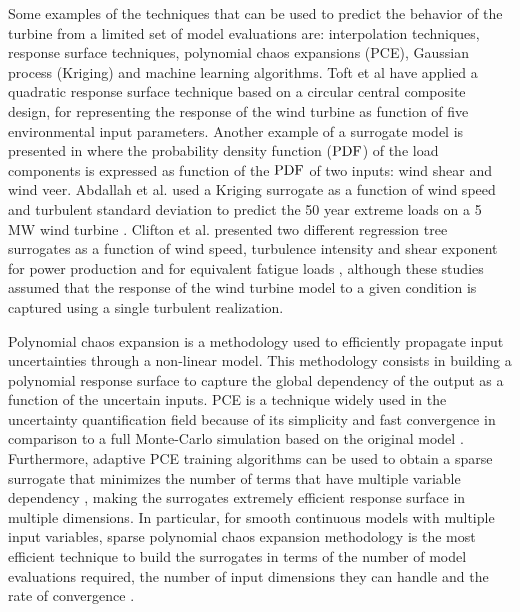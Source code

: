 \documentclass[preprint,12pt]{elsarticle}
\begin{document}
Some examples of the techniques that can be used to predict the behavior of the turbine from a limited set of model evaluations are: interpolation techniques, response surface techniques, polynomial chaos expansions (PCE), Gaussian process (Kriging) and machine learning algorithms. Toft et al \cite{toft2016assessment} have applied a quadratic response surface technique based on a circular central composite design, for representing the response of the wind turbine as function of five environmental input parameters. Another example of a surrogate model is presented in \cite{TallwindReport} where the probability density function ($\mathrm{PDF}$) of the load components is expressed as function of the $\mathrm{PDF}$ of two inputs: wind shear and wind veer. Abdallah et al. used a Kriging surrogate as a function of wind speed and turbulent standard deviation to predict the 50 year extreme loads on a 5 MW wind turbine \cite{abdallah2016influence}. Clifton et al. presented two different regression tree surrogates as a function of wind speed, turbulence intensity and shear exponent for power production \cite{clifton2013using} and for equivalent fatigue loads \cite{clifton2014effect}, although these studies assumed that the response of the wind turbine model to a given condition is captured using a single turbulent realization.

Polynomial chaos expansion is a methodology used to efficiently propagate input uncertainties through a non-linear model. This methodology consists in building a polynomial response surface to capture the global dependency of the output as a function of the uncertain inputs. PCE is a technique widely used in the uncertainty quantification field because of its simplicity and fast convergence in comparison to a full Monte-Carlo simulation based on the original model \cite{soize2004physical, le2004uncertainty, choi2004polynomial, berveiller2006stochastic, xiu2005high}. Furthermore, adaptive PCE training algorithms can be used to obtain a sparse surrogate that minimizes the number of terms that have multiple variable dependency \cite{blatman2011adaptive,pedregosa2011scikit,tibshirani1996regression}, making the surrogates extremely efficient response surface in multiple dimensions. In particular, for smooth continuous models with multiple input variables, sparse polynomial chaos expansion methodology is the most efficient technique to build the surrogates in terms of the number of model evaluations required, the number of input dimensions they can handle and the rate of convergence \cite{blatman2011adaptive}.
\end{document}
